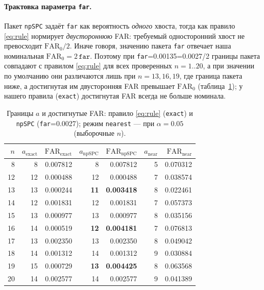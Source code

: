 \documentclass[11pt,a4paper]{article}
\begin{document}
\paragraph{Трактовка параметра \texttt{far}.}
Пакет \texttt{npSPC} задаёт \texttt{far} как вероятность \emph{одного}
хвоста, тогда как правило \eqref{eq:rule} нормирует \emph{двустороннюю}
FAR: требуемый односторонний хвост не превосходит $\mathrm{FAR}_0/2$.
Иначе говоря, значению пакета \texttt{far} отвечает наша номинальная
$\mathrm{FAR}_0=2\,\texttt{far}$. Поэтому при
\texttt{far}=0.00135=0.0027/2 границы пакета совпадают с правилом
\eqref{eq:rule} для всех проверенных $n=1..20$, а при значении по умолчанию
они различаются лишь при $n=13,16,19$, где граница пакета ниже, а достигнутая
им двусторонняя FAR превышает $\mathrm{FAR}_0$ (таблица~\ref{tab:limits});
у нашего правила (\texttt{exact}) достигнутая FAR всегда не больше номинала.

\begin{table}[htbp]\centering
\caption{Границы $a$ и достигнутые FAR: правило \eqref{eq:rule} (\texttt{exact})
и \texttt{npSPC} (\texttt{far}=0.0027); режим \texttt{nearest} --- при
$\alpha=0.05$ (выборочные $n$).}
\label{tab:limits}
\small
\begin{tabular}{@{}r r r r r r r@{}}
\toprule
$n$ & $a_{\mathrm{exact}}$ & $\mathrm{FAR}_{\mathrm{exact}}$
    & $a_{\mathrm{npSPC}}$ & $\mathrm{FAR}_{\mathrm{npSPC}}$
    & $a_{\mathrm{near}}$ & $\mathrm{FAR}_{\mathrm{near}}$ \\
\midrule
 8 &  8 & 0.007812 &  8 & 0.007812 & 5 & 0.070312 \\
12 & 12 & 0.000488 & 12 & 0.000488 & 7 & 0.038574 \\
13 & 13 & 0.000244 & \textbf{11} & \textbf{0.003418} & 8 & 0.022461 \\
14 & 12 & 0.001831 & 12 & 0.001831 & 7 & 0.057373 \\
15 & 13 & 0.000977 & 13 & 0.000977 & 8 & 0.035156 \\
16 & 14 & 0.000519 & \textbf{12} & \textbf{0.004181} & 7 & 0.076813 \\
17 & 13 & 0.002350 & 13 & 0.002350 & 8 & 0.049042 \\
18 & 14 & 0.001312 & 14 & 0.001312 & 9 & 0.030884 \\
19 & 15 & 0.000729 & \textbf{13} & \textbf{0.004425} & 8 & 0.063568 \\
20 & 14 & 0.002577 & 14 & 0.002577 & 9 & 0.041389 \\
\bottomrule
\end{tabular}
\end{table}
\end{document}
